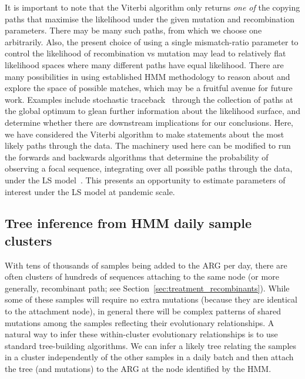 \documentclass{article}
\begin{document}
It is important to note that the Viterbi algorithm only returns \emph{one of}
the copying paths that maximise the likelihood under the given mutation and
recombination parameters. There may be many such paths, from which we choose
one arbitrarily. Also, the present choice of using a single mismatch-ratio
parameter to control the likelihood of recombination vs mutation may lead to
relatively flat likelihood spaces where many different paths have equal
likelihood.
There are many possibilities in using established HMM methodology
to reason about and explore the space of possible matches, which may be a
fruitful avenue for future work.
Examples include stochastic traceback~\citep[e.g.,][]{rasmussen2014genome}
through the collection of paths at the global optimum to glean further
information about the likelihood surface, and determine whether there are
downstream implications for our conclusions. Here, we have considered the
Viterbi algorithm to make statements about the most likely paths through the
data. The machinery used here can be modified to run the forwards and backwards
algorithms that determine the probability of observing a focal sequence,
integrating over all possible paths through the data, under the LS
model~\citep{Palmer2023-efficient}.
This presents an opportunity to estimate parameters of interest
under the LS model at pandemic scale.

\subsection{Tree inference from HMM daily sample clusters}
\label{sec:sample-cluster-tree-inference}
With tens of thousands of samples being added to the ARG per day,
there are often clusters of hundreds of sequences attaching to the same node
(or more generally, recombinant path;
see Section~\ref{sec:treatment_recombinants}).
While some of these samples will require no extra mutations
(because they are identical to the attachment node), in general there
will be complex patterns of shared mutations among the samples
reflecting their evolutionary relationships. A natural way to infer
these within-cluster evolutionary relationships is to use standard
tree-building algorithms.
We can infer a likely tree relating the
samples in a cluster independently of the other samples in a
daily batch and then attach the tree (and mutations)
to the ARG at the node identified by the HMM.
\end{document}
